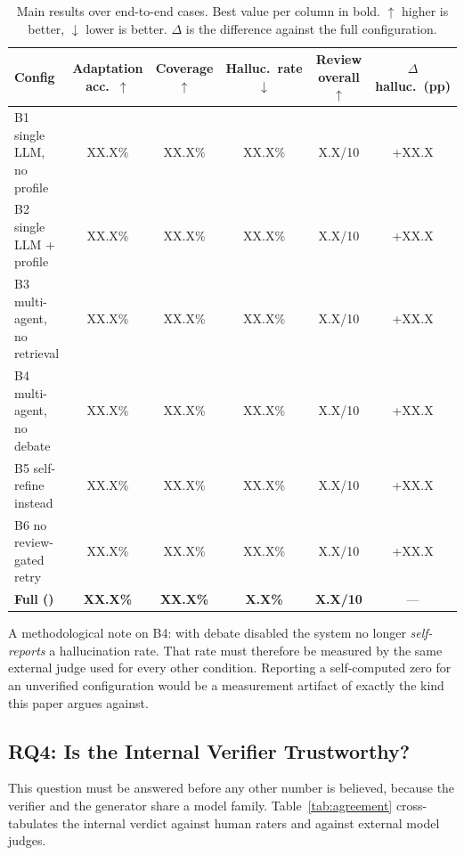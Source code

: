\begin{table}[!t]
\centering
\caption{Main results over  end-to-end cases. Best value per column
in bold. $\uparrow$ higher is better, $\downarrow$ lower is better.
$\Delta$ is the difference against the full configuration.}
\label{tab:main}
\begin{tabular}{@{}lccccc@{}}
\toprule
\textbf{Config} & \textbf{Adaptation acc.\ $\uparrow$} & \textbf{Coverage $\uparrow$} &
\textbf{Halluc.\ rate $\downarrow$} & \textbf{Review overall $\uparrow$} & \textbf{$\Delta$ halluc.\ (pp)} \\
\midrule
B1 single LLM, no profile      & XX.X\% & XX.X\% & XX.X\% & X.X/10 & +XX.X \\
B2 single LLM + profile        & XX.X\% & XX.X\% & XX.X\% & X.X/10 & +XX.X \\
B3 multi-agent, no retrieval   & XX.X\% & XX.X\% & XX.X\% & X.X/10 & +XX.X \\
B4 multi-agent, no debate      & XX.X\% & XX.X\% & XX.X\% & X.X/10 & +XX.X \\
B5 self-refine instead         & XX.X\% & XX.X\% & XX.X\% & X.X/10 & +XX.X \\
B6 no review-gated retry       & XX.X\% & XX.X\% & XX.X\% & X.X/10 & +XX.X \\
\midrule
\textbf{Full (\sysname{})}     & \textbf{XX.X\%} & \textbf{XX.X\%} & \textbf{X.X\%} & \textbf{X.X/10} & --- \\
\bottomrule
\end{tabular}
\end{table}

A methodological note on B4: with debate disabled the system no longer
\emph{self-reports} a hallucination rate. That rate must therefore be
measured by the same external judge used for every other condition. Reporting
a self-computed zero for an unverified configuration would be a measurement
artifact of exactly the kind this paper argues against.

\subsection{RQ4: Is the Internal Verifier Trustworthy?}

This question must be answered before any other number is believed, because
the verifier and the generator share a model family. Table~\ref{tab:agreement}
cross-tabulates the internal verdict against human raters and against external
model judges.

